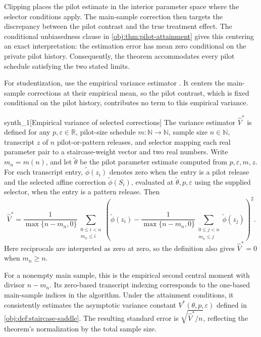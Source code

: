 \documentclass[11pt]{article}
\begin{document}
Clipping places the pilot estimate in the interior parameter space where the selector conditions apply. The main-sample correction then targets the discrepancy between the pilot contrast and the true treatment effect. The conditional unbiasedness clause in \cref{obj:thm:pilot-attainment} gives this centering an exact interpretation: the estimation error has mean zero conditional on the private pilot history. Consequently, the theorem accommodates every pilot schedule satisfying the two stated limits.

For studentization, use the empirical variance estimator . It centers the main-sample corrections at their empirical mean, so the pilot contrast, which is fixed conditional on the pilot history, contributes no term to this empirical variance.

\begin{definitionv}{synth_1}[Empirical variance of selected corrections]
The variance estimator \(\widehat V^*\) is defined for any \(p,\varepsilon\in\mathbb R\), pilot-size schedule \(m:\mathbb N\to\mathbb N\), sample size \(n\in\mathbb N\), transcript \(z\) of \(n\) pilot-or-pattern releases, and selector mapping each real parameter pair to a staircase-weight vector and two real numbers. Write \(m_n=m(n)\), and let \(\widetilde\theta\) be the pilot parameter estimate computed from \(p,\varepsilon,m,z\). For each transcript entry, \(\widetilde\phi(z_i)\) denotes zero when the entry is a pilot release and the selected affine correction \(\widetilde\phi(S_i)\), evaluated at \(\widetilde\theta,p,\varepsilon\) using the supplied selector, when the entry is a pattern release. Then
\[
\widehat V^*
=
\frac{1}{\max\{n-m_n,0\}}
\sum_{\substack{0\le i<n\\m_n\le i}}
\left(
\widetilde\phi(z_i)
-
\frac{1}{\max\{n-m_n,0\}}
\sum_{\substack{0\le j<n\\m_n\le j}}
\widetilde\phi(z_j)
\right)^2.
\]
Here reciprocals are interpreted as zero at zero, so the definition also gives \(\widehat V^*=0\) when \(m_n\ge n\).
\end{definitionv}

For a nonempty main sample, this is the empirical second central moment with divisor \(n-m_n\). Its zero-based transcript indexing corresponds to the one-based main-sample indices in the algorithm. Under the attainment conditions, it consistently estimates the asymptotic variance constant \(V^*(\theta,p,\varepsilon)\) defined in \cref{obj:def:staircase-saddle}. The resulting standard error is \(\sqrt{\widehat V^*/n}\), reflecting the theorem's normalization by the total sample size.
\end{document}
